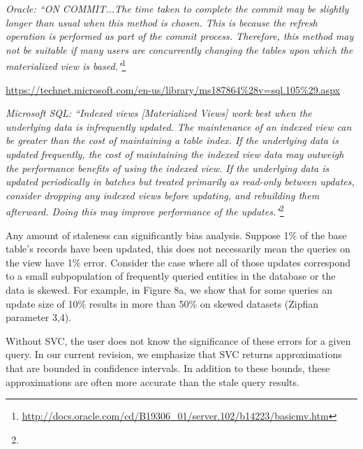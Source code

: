 \vspace{0.5em}

\emph{Oracle: ``ON COMMIT...The time taken to complete the commit may be slightly longer than usual when this method is chosen. This is because the refresh operation is performed as part of the commit process. Therefore, this method may not be suitable if many users are concurrently changing the tables upon which the materialized view is based."}\footnote{\url{http://docs.oracle.com/cd/B19306_01/server.102/b14223/basicmv.htm}}


\vspace{0.5em}

\urldef{\microsoft}\url{https://technet.microsoft.com/en-us/library/ms187864%28v=sql.105%29.aspx}

\emph{Microsoft SQL: ``Indexed views [Materialized Views] work best when the underlying data is infrequently updated. The maintenance of an indexed view can be greater than the cost of maintaining a table index. If the underlying data is updated frequently, the cost of maintaining the indexed view data may outweigh the performance benefits of using the indexed view. If the underlying data is updated periodically in batches but treated primarily as read-only between updates, consider dropping any indexed views before updating, and rebuilding them afterward. Doing this may improve performance of the updates."}\footnote{\microsoft}

\vspace{0.5em}

Any amount of staleness can significantly bias analysis. Suppose 1\% of the base table's records have been updated, this does not necessarily mean the queries on the view have 1\% error.  Consider the case where all of those updates correspond to a small subpopulation of frequently queried entities in the database or the data is skewed. For example, in Figure 8a, we show that for some queries an update size of 10\% results in more than 50\% on  skewed datasets (Zipfian parameter 3,4).

Without SVC, the user does not know the significance of these errors for a given query. 
In our current revision, we emphasize that SVC returns approximations that are bounded in confidence intervals.
In addition to these bounds, these approximations are often more accurate than the stale query results.

